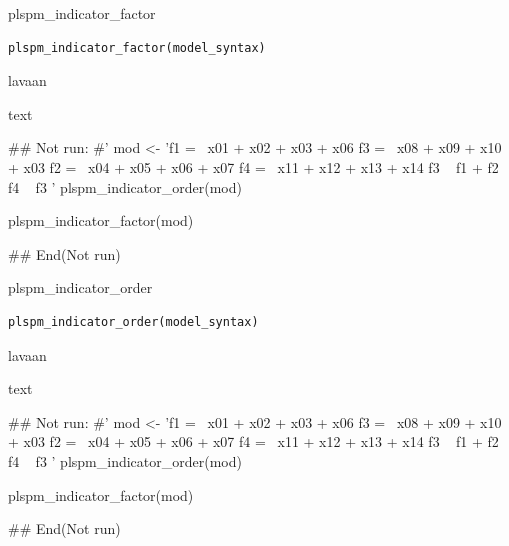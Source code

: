\documentclass[a4paper]{book}
\begin{document}
%
\begin{Description}
plspm\_indicator\_factor
\end{Description}
%
\begin{Usage}
\begin{verbatim}
plspm_indicator_factor(model_syntax)
\end{verbatim}
\end{Usage}
%
\begin{Arguments}
\begin{ldescription}
\item[\code{model\_syntax}] lavaan
\end{ldescription}
\end{Arguments}
%
\begin{Value}
text
\end{Value}
%
\begin{Examples}
\begin{ExampleCode}

\#\# Not run: 
#'
mod <-
  'f1 =~ x01 + x02 + x03 + x06
    f3 =~ x08 + x09 + x10 + x03
    f2 =~ x04 + x05 + x06 + x07
    f4 =~ x11 + x12 + x13 + x14
    f3 ~ f1 + f2
    f4 ~ f3
   '
plspm_indicator_order(mod)

plspm_indicator_factor(mod)

## End(Not run)

\end{ExampleCode}
\end{Examples}

%
\begin{Description}
plspm\_indicator\_order
\end{Description}
%
\begin{Usage}
\begin{verbatim}
plspm_indicator_order(model_syntax)
\end{verbatim}
\end{Usage}
%
\begin{Arguments}
\begin{ldescription}
\item[\code{model\_syntax}] lavaan
\end{ldescription}
\end{Arguments}
%
\begin{Value}
text
\end{Value}
%
\begin{Examples}
\begin{ExampleCode}
\#\# Not run: 
#'
mod <-
  'f1 =~ x01 + x02 + x03 + x06
    f3 =~ x08 + x09 + x10 + x03
    f2 =~ x04 + x05 + x06 + x07
    f4 =~ x11 + x12 + x13 + x14
    f3 ~ f1 + f2
    f4 ~ f3
   '
plspm_indicator_order(mod)

plspm_indicator_factor(mod)

## End(Not run)

\end{ExampleCode}
\end{Examples}
\end{document}
